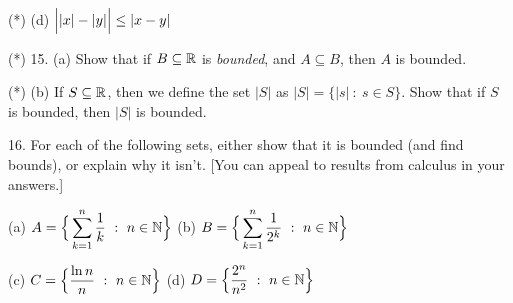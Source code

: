 \documentclass[12pt]{article}
\begin{document}
\begin{description}
\ssk

\item{(*)} (d) $\Bigl||x|-|y|\Bigr| \leq |x-y|$

\msk

\item{(*) 15.} (a) Show that if $B\subseteq{\mathbb R}$ is {\it bounded}, and $A\subseteq B$, 
then $A$ is bounded.

\ssk

\item{(*)} (b) If $S\subseteq{\mathbb R}$, then we define the set $|S|$ as $|S|=\{|s|\ :\ s\in S\}$.
Show that if $S$ is bounded, then $|S|$ is bounded.

\msk

\item{16.} For each of the following sets, either show that it is bounded (and find bounds), or 
explain why it isn't. [You can appeal to results from calculus in your answers.]

\ssk

\item{\spc} (a) $\displaystyle A = \Big\{\sum_{k=1}^n {{1}\over{k}}\ :\ n\in{\mathbb N}\Big\}$
\hskip2in (b) $\dsp B = \Big\{\sum_{k=1}^n {{1}\over{2^k}}\ :\ n\in\bbn\Big\}$

\ssk

\item{\spc} (c) $\dsp C = \Big\{ {{\ln n}\over{n}}\ :\ n\in\bbn\Big\}$
\hskip2in (d) $\displaystyle D = \Big\{ {{2^n}\over{n^2}}\ :\ n\in{\mathbb N}\Big\}$


\end{description}
\vfill
\end{document}
